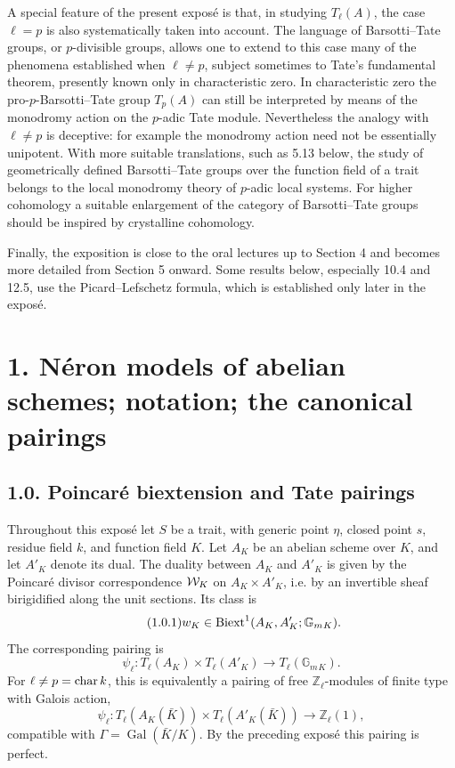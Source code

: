 \documentclass[11pt]{article}
\providecommand{\Gal}{\operatorname{Gal}}
\providecommand{\Z}{\mathbb Z}
\providecommand{\Gm}{\mathbb G_m}
\begin{document}
A special feature of the present expos\'e is that, in studying \(T_\ell(A)\), the case \(\ell=p\) is also systematically taken into account.  The language of Barsotti--Tate groups, or \(p\)-divisible groups, allows one to extend to this case many of the phenomena established when \(\ell\ne p\), subject sometimes to Tate's fundamental theorem, presently known only in characteristic zero.  In characteristic zero the pro-\(p\)-Barsotti--Tate group \(T_p(A)\) can still be interpreted by means of the monodromy action on the \(p\)-adic Tate module.  Nevertheless the analogy with \(\ell\ne p\) is deceptive: for example the monodromy action need not be essentially unipotent.  With more suitable translations, such as 5.13 below, the study of geometrically defined Barsotti--Tate groups over the function field of a trait belongs to the local monodromy theory of \(p\)-adic local systems.  For higher cohomology a suitable enlargement of the category of Barsotti--Tate groups should be inspired by crystalline cohomology.

Finally, the exposition is close to the oral lectures up to Section 4 and becomes more detailed from Section 5 onward.  Some results below, especially 10.4 and 12.5, use the Picard--Lefschetz formula, which is established only later in the expos\'e.

\section*{1. N\'eron models of abelian schemes; notation; the canonical pairings}

\subsection*{1.0. Poincar\'e biextension and Tate pairings}
Throughout this expos\'e let \(S\) be a trait, with generic point \(\eta\), closed point \(s\), residue field \(k\), and function field \(K\).  Let \(A_K\) be an abelian scheme over \(K\), and let \(A'_K\) denote its dual.  The duality between \(A_K\) and \(A'_K\) is given by the Poincar\'e divisor correspondence \(\mathcal W_K\) on \(A_K\times A'_K\), i.e. by an invertible sheaf birigidified along the unit sections.  Its class is
\begin{equation}\tag{1.0.1}
 w_K\in \Biext^1(A_K,A'_K;\Gm{}_K).
\end{equation}
The corresponding pairing is
\begin{equation}\tag{1.0.2}
 \psi_\ell:T_\ell(A_K)\times T_\ell(A'_K)\longrightarrow T_\ell(\Gm{}_K).
\end{equation}
For \(\ell\ne p=\operatorname{char} k\), this is equivalently a pairing of free \(\Z_\ell\)-modules of finite type with Galois action,
\begin{equation}\tag{1.0.3}
 \psi_\ell:T_\ell(A_K(\bar K))\times T_\ell(A'_K(\bar K))\longrightarrow \Z_\ell(1),
\end{equation}
compatible with \(\Gamma=\Gal(\bar K/K)\).  By the preceding expos\'e this pairing is perfect.
\end{document}

